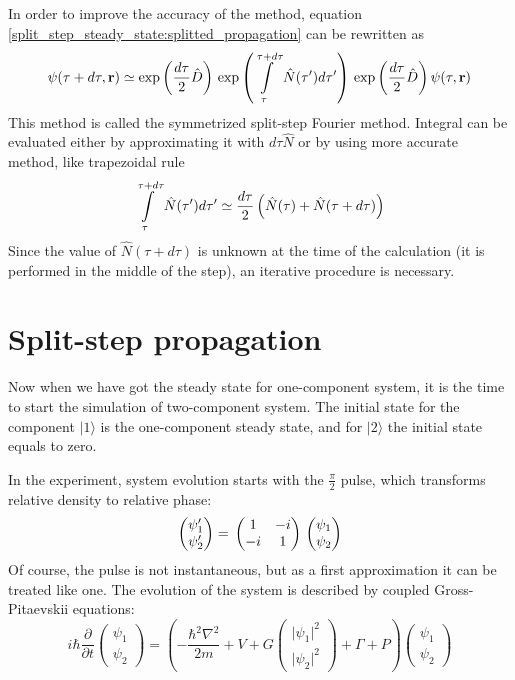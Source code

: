 \documentclass[12pt,notitlepage]{report}
\begin{document}
In order to improve the accuracy of the method, equation \ref{split_step_steady_state:splitted_propagation}
can be rewritten as
\[
\psi(\tau + d\tau, \mathbf{r}) \simeq \exp \left( \frac{d\tau}{2} \hat{D} \right) \\
\exp \left( \int\limits^{\tau + d\tau}_\tau \hat{N} (\tau^\prime) d\tau^\prime \right) \\
\exp \left( \frac{d\tau}{2} \hat{D} \right) \psi(\tau, \mathbf{r})
\]
This method is called the symmetrized split-step Fourier method. Integral can be evaluated either by approximating it
with $d\tau\hat{N}$ or by using more accurate method, like trapezoidal rule
\[
\int\limits^{\tau + d\tau}_\tau \hat{N} (\tau^\prime) d\tau^\prime \simeq \\
\frac{d\tau}{2} \left( \hat{N}(\tau) + \hat{N}(\tau + d\tau) \right)
\]
Since the value of $\hat{N}(\tau + d\tau)$ is unknown at the time of the calculation (it is performed in the
middle of the step), an iterative procedure is necessary.

\section*{Split-step propagation}

Now when we have got the steady state for one-component system, it is the time to start the simulation of
two-component system. The initial state for the component $\vert1\rangle$ is the one-component steady state,
and for $\vert2\rangle$ the initial state equals to zero.

In the experiment, system evolution starts with the $\frac{\pi}{2}$ pulse, which transforms relative density
to relative phase:
\[
\begin{pmatrix}
	\psi^\prime_1 \\
	\psi^\prime_2
\end{pmatrix} = \\
\begin{pmatrix}
	1 & -i \\
	-i & 1
\end{pmatrix} \\
\begin{pmatrix}
	\psi_1 \\
	\psi_2
\end{pmatrix}
\]
Of course, the pulse is not instantaneous, but as a first approximation it can be treated like one.
The evolution of the system is described by coupled Gross-Pitaevskii equations:
\[
i \hbar \frac{\partial}{\partial t} \begin{pmatrix}
	\psi_1 \\ \psi_2
\end{pmatrix} = \left(
	-\frac{\hbar^2\nabla^2}{2m} + V + G \begin{pmatrix}
		\vert \psi_1 \vert^2 \\ \vert \psi_2 \vert^2
	\end{pmatrix} + \Gamma + P
\right)
\begin{pmatrix}
	\psi_1 \\ \psi_2
\end{pmatrix}
\]



\end{document}
